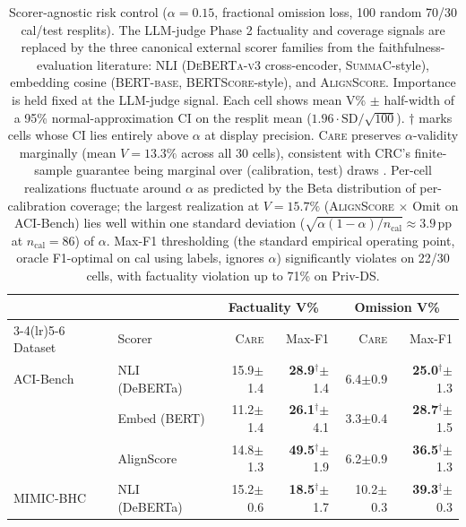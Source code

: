 \begin{table}[t]
\centering
\small
\setlength{\tabcolsep}{4pt}
\caption{Scorer-agnostic risk control ($\alpha = 0.15$, fractional omission loss, 100 random 70/30 cal/test resplits). The LLM-judge Phase 2 factuality and coverage signals are replaced by the three canonical external scorer families from the faithfulness-evaluation literature: NLI (\textsc{DeBERTa-v3} cross-encoder, \textsc{SummaC}-style), embedding cosine (\textsc{BERT-base}, \textsc{BERTScore}-style), and \textsc{AlignScore}. Importance is held fixed at the LLM-judge signal. Each cell shows mean V\% $\pm$ half-width of a 95\% normal-approximation CI on the resplit mean ($1.96 \cdot \text{SD}/\sqrt{100}$). $\dagger$ marks cells whose CI lies entirely above $\alpha$ at display precision. \textsc{Care} preserves $\alpha$-validity marginally (mean $V=13.3\%$ across all 30 cells), consistent with CRC's finite-sample guarantee being marginal over (calibration, test) draws \citep{angelopoulos-crc-2024}. Per-cell realizations fluctuate around $\alpha$ as predicted by the Beta distribution of per-calibration coverage; the largest realization at $V=15.7\%$ (\textsc{AlignScore} $\times$ Omit on ACI-Bench) lies well within one standard deviation ($\sqrt{\alpha(1-\alpha)/n_{\mathrm{cal}}} \approx 3.9$\,pp at $n_{\mathrm{cal}}=86$) of $\alpha$. Max-F1 thresholding (the standard empirical operating point, oracle F1-optimal on cal using labels, ignores $\alpha$) significantly violates on 22/30 cells, with factuality violation up to 71\% on Priv-DS.}
\label{tab:external-scorers}
\begin{tabular}{ll rr rr}
\toprule
 & & \multicolumn{2}{c}{Factuality V\%} & \multicolumn{2}{c}{Omission V\%} \\
\cmidrule(lr){3-4}\cmidrule(lr){5-6}
Dataset & Scorer & \textsc{Care} & Max-F1 & \textsc{Care} & Max-F1 \\
\midrule
ACI-Bench & NLI (DeBERTa) & 15.9{\scriptsize $\pm$1.4} & \textbf{28.9}$^\dagger${\scriptsize $\pm$1.4} & 6.4{\scriptsize $\pm$0.9} & \textbf{25.0}$^\dagger${\scriptsize $\pm$1.3} \\
 & Embed (BERT) & 11.2{\scriptsize $\pm$1.4} & \textbf{26.1}$^\dagger${\scriptsize $\pm$4.1} & 3.3{\scriptsize $\pm$0.4} & \textbf{28.7}$^\dagger${\scriptsize $\pm$1.5} \\
 & AlignScore & 14.8{\scriptsize $\pm$1.3} & \textbf{49.5}$^\dagger${\scriptsize $\pm$1.9} & 6.2{\scriptsize $\pm$0.9} & \textbf{36.5}$^\dagger${\scriptsize $\pm$1.3} \\
\midrule
MIMIC-BHC & NLI (DeBERTa) & 15.2{\scriptsize $\pm$0.6} & \textbf{18.5}$^\dagger${\scriptsize $\pm$1.7} & 10.2{\scriptsize $\pm$0.3} & \textbf{39.3}$^\dagger${\scriptsize $\pm$0.3} \\

\end{tabular}
\end{table}
